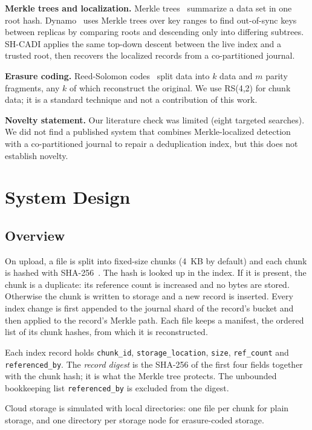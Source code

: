 \documentclass[conference]{IEEEtran}
\newcommand{\code}[1]{\texttt{#1}}
\begin{document}
\textbf{Merkle trees and localization.} Merkle trees~\cite{merkle} summarize a data set in one root hash. Dynamo~\cite{dynamo} uses Merkle trees over key ranges to find out-of-sync keys between replicas by comparing roots and descending only into differing subtrees. SH-CADI applies the same top-down descent between the live index and a trusted root, then recovers the localized records from a co-partitioned journal.

\textbf{Erasure coding.} Reed-Solomon codes~\cite{reedsolomon} split data into $k$ data and $m$ parity fragments, any $k$ of which reconstruct the original. We use RS(4,2) for chunk data; it is a standard technique and not a contribution of this work.

\textbf{Novelty statement.} Our literature check was limited (eight targeted searches). We did not find a published system that combines Merkle-localized detection with a co-partitioned journal to repair a deduplication index, but this does not establish novelty.

\section{System Design}
\label{sec:design}

\subsection{Overview}

On upload, a file is split into fixed-size chunks (4~KB by default) and each chunk is hashed with SHA-256~\cite{sha}. The hash is looked up in the index. If it is present, the chunk is a duplicate: its reference count is increased and no bytes are stored. Otherwise the chunk is written to storage and a new record is inserted. Every index change is first appended to the journal shard of the record's bucket and then applied to the record's Merkle path. Each file keeps a manifest, the ordered list of its chunk hashes, from which it is reconstructed.

Each index record holds \code{chunk\_id}, \code{storage\_location}, \code{size}, \code{ref\_count} and \code{referenced\_by}. The \emph{record digest} is the SHA-256 of the first four fields together with the chunk hash; it is what the Merkle tree protects. The unbounded bookkeeping list \code{referenced\_by} is excluded from the digest.

Cloud storage is simulated with local directories: one file per chunk for plain storage, and one directory per storage node for erasure-coded storage.
\end{document}
